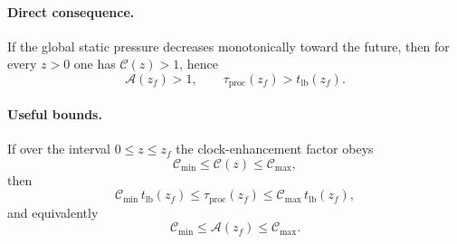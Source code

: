 \documentclass[11pt]{article}
\begin{document}
\paragraph{Direct consequence.}
If the global static pressure decreases monotonically toward the future,
then for every $z>0$ one has $\mathcal{C}(z)>1$, hence
\begin{equation}
  \mathcal{A}(z_f) > 1,
  \qquad
  \tau_{\mathrm{proc}}(z_f) > t_{\mathrm{lb}}(z_f).
  \label{eq:tauproc_gt_tlb}
\end{equation}

\paragraph{Useful bounds.}
If over the interval $0\le z\le z_f$ the clock-enhancement factor obeys
\begin{equation}
  \mathcal{C}_{\min} \le \mathcal{C}(z) \le \mathcal{C}_{\max},
  \label{eq:Cbounds_app18}
\end{equation}
then
\begin{equation}
  \mathcal{C}_{\min}\,t_{\mathrm{lb}}(z_f)
  \le \tau_{\mathrm{proc}}(z_f)
  \le \mathcal{C}_{\max}\,t_{\mathrm{lb}}(z_f),
  \label{eq:taubounds_app18}
\end{equation}
and equivalently
\begin{equation}
  \mathcal{C}_{\min} \le \mathcal{A}(z_f) \le \mathcal{C}_{\max}.
  \label{eq:Abounds_app18}
\end{equation}
\end{document}
